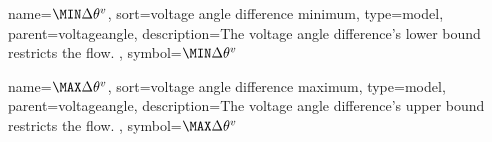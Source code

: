 {
    name={\ensuremath{ \deltavanglemin }},
    sort={voltage angle difference minimum},
    type={model},
    parent={voltageangle},
    description={The voltage angle difference's lower
    bound~ restricts the flow.
    },
    symbol={\ensuremath{ \deltavanglemin }}
}

{
    name={\ensuremath{ \deltavanglemax }},
    sort={voltage angle difference maximum},
    type={model},
    parent={voltageangle},
    description={The voltage angle difference's upper
    bound~ restricts the flow.
    },
    symbol={\ensuremath{ \deltavanglemax }}
}
